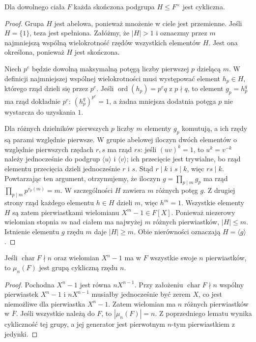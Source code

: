 \begin{lemat}
Dla dowolnego ciała $F$ każda skończona podgrupa $H\leq F^\times$
jest cykliczna.
\end{lemat}
\begin{proof}
Grupa $H$ jest abelowa, ponieważ mnożenie w ciele jest przemienne.
Jeśli $H=\{1\}$, teza jest spełniona. Załóżmy, że $|H|>1$
i oznaczmy przez $m$ najmniejszą wspólną wielokrotność
rzędów wszystkich elementów $H$. Jest ona określona,
ponieważ $H$ jest skończona.

Niech $p^e$ będzie dowolną maksymalną potęgą liczby pierwszej
$p$ dzielącą $m$. W definicji najmniejszej wspólnej wielokrotności
musi występować element $h_p\in H$, którego rząd dzieli się przez
$p^e$. Jeśli $\operatorname{ord}(h_p)=p^e q$ z $p\nmid q$,
to element $g_p=h_p^q$ ma rząd dokładnie $p^e$:
$(h_p^q)^{p^e}=1$, a żadna mniejsza dodatnia potęga $p$
nie wystarcza do uzyskania $1$.

Dla różnych dzielników pierwszych $p$ liczby $m$ elementy
$g_p$ komutują, a ich rzędy są parami względnie pierwsze.
W grupie abelowej iloczyn dwóch elementów o względnie
pierwszych rzędach $r,s$ ma rząd $rs$: jeśli
$(uv)^k=1$, to $u^k=v^{-k}$ należy jednocześnie
do podgrup $\langle u\rangle$ i $\langle v\rangle$; ich
przecięcie jest trywialne, bo rząd elementu przecięcia
dzieli jednocześnie $r$ i $s$. Stąd $r\mid k$ i $s\mid k$,
więc $rs\mid k$. Powtarzając ten argument, otrzymujemy,
że iloczyn $g=\prod_{p\mid m}g_p$ ma rząd
$\prod_{p\mid m}p^{v_p(m)}=m$.
W szczególności $H$ zawiera $m$ różnych potęg $g$.
Z drugiej strony rząd każdego elementu $h\in H$ dzieli $m$,
więc $h^m=1$. Wszystkie elementy $H$ są zatem pierwiastkami
wielomianu $X^m-1\in F[X]$. Ponieważ niezerowy wielomian
stopnia $m$ nad ciałem ma najwyżej $m$ różnych pierwiastków,
$|H|\leq m$. Istnienie elementu $g$ rzędu $m$ daje
$|H|\geq m$. Obie nierówności oznaczają
$H=\langle g\rangle$.
\end{proof}

\begin{wniosek}
Jeśli $\operatorname{char}F\nmid n$ oraz wielomian $X^n-1$
ma w $F$ wszystkie swoje $n$ pierwiastków, to
$\mu_n(F)$ jest grupą cykliczną rzędu $n$.
\end{wniosek}
\begin{proof}
Pochodna $X^n-1$ jest równa $nX^{n-1}$.
Przy założeniu $\operatorname{char}F\nmid n$ wspólny pierwiastek
$X^n-1$ i $nX^{n-1}$ musiałby jednocześnie być zerem
$X$, co jest niemożliwe dla pierwiastka $X^n-1$.
Zatem wielomian ma $n$ różnych pierwiastków w $\overline F$.
Jeśli wszystkie należą do $F$, to $|\mu_n(F)|=n$.
Z poprzedniego lematu wynika cykliczność tej grupy,
a jej generator jest pierwotnym $n$-tym pierwiastkiem z jedynki.
\end{proof}


